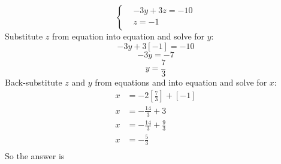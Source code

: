 \begin{equation*}
    \begin{cases}
        &-3y + 3z = -10 \\   %
        &z = -1 \\           %
    \end{cases}
\end{equation*}
%
Substitute $z$ from equation  into equation  
and solve for $y$:
\[- 3y + 3\left[-1\right] = -10\]
\[-3y = -7\]
\[y = \frac{7}{3}\] %
%
Back-substitute $z$ and $y$ from equations  and  
into equation 
and solve for $x$:
\begin{align*}
    x &= -2 \left[ \frac{7}{3} \right] + \left[-1\right]\\
    x &= - \frac{14}{3} + 3\\
    x &= - \frac{14}{3} + \frac{9}{3}\\
    x &= - \frac{5}{3}\\
\end{align*}
%
So the answer is 